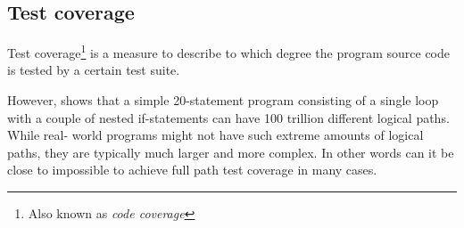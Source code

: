 \subsection{Test coverage}

Test coverage\footnote{Also known as \emph{code coverage}} is a measure to
describe to which degree the program source code is tested by a certain
test suite.\cite{wiki:coverage}

However, \citeauthor{book:art_of_testing} shows that a simple
20-statement program consisting of a single loop with a couple of nested
if-statements can have 100 trillion different logical paths. While real-
world programs might not have such extreme amounts of logical paths,
they are typically much larger and more complex. In other words can it
be close to impossible to achieve full path test coverage in many
cases.\\


